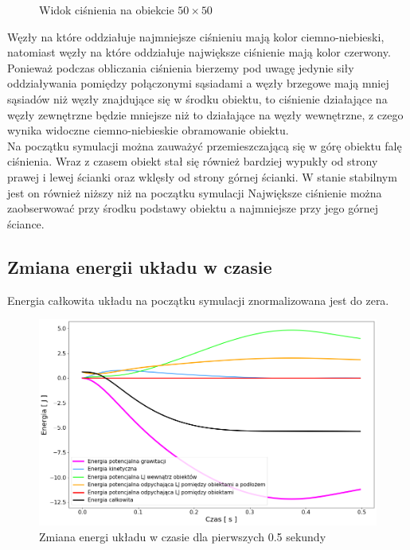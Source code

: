 \documentclass[12pt, letterpaper]{report}
\begin{document}
\begin{figure}[h]
        \caption{Widok ciśnienia na obiekcie $50 \times 50$}
    \end{figure}

    Węzły na które oddziałuje najmniejsze ciśnieniu mają kolor ciemno-niebieski, natomiast węzły na które oddziałuje 
    największe ciśnienie mają kolor czerwony. Ponieważ podczas obliczania ciśnienia bierzemy pod uwagę jedynie 
    siły oddziaływania pomiędzy połączonymi sąsiadami a węzły brzegowe mają mniej sąsiadów niż węzły znajdujące
    się w środku obiektu, to ciśnienie działające na węzły zewnętrzne będzie mniejsze niż to działające na
    węzły wewnętrzne, z czego wynika widoczne ciemno-niebieskie obramowanie obiektu. \\

    Na początku symulacji można zauważyć przemieszczającą się w górę obiektu falę ciśnienia. Wraz z czasem 
    obiekt stał się również bardziej wypukły od strony prawej i lewej ścianki
    oraz wklęsły od strony górnej ścianki. W stanie stabilnym jest on również niższy niż na początku symulacji 
    Największe ciśnienie można zaobserwować przy środku podstawy obiektu a najmniejsze przy jego 
    górnej ściance.

    \subsection{Zmiana energii układu w czasie}
    Energia całkowita układu na początku symulacji znormalizowana jest do zera. 

    \begin{figure}[H]
        \centering
        \includegraphics[width=14cm]{pressure_energy_01}
        \caption{
            Zmiana energi układu w czasie dla pierwszych 0.5 sekundy
        }
    \end{figure}
\end{document}
